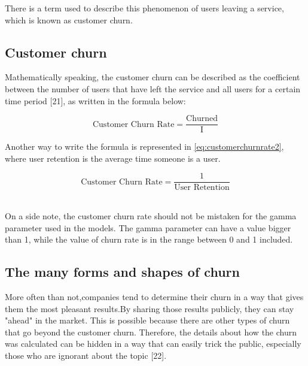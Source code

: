 \documentclass{article}
\begin{document}
There‌‌ is‌‌ a‌‌ term‌‌ used‌‌ to‌‌ describe‌‌ this‌‌ phenomenon‌‌ of‌‌ users‌‌ leaving‌‌ a‌‌ service, ‌‌which ‌‌is ‌‌known‌‌ as‌‌ customer‌ ‌churn.‌ \newpage

\subsection{Customer churn}

Mathematically‌ ‌speaking,‌ ‌the‌ ‌customer‌ ‌churn‌ ‌can‌ ‌be‌ ‌described‌ ‌as‌ ‌the‌ ‌coefficient‌ ‌between‌ ‌the‌‌
number‌ ‌of‌ ‌users‌ ‌that‌ ‌have‌ ‌left‌ ‌the‌ ‌service‌ ‌and‌ ‌all‌ ‌users‌ ‌for‌ ‌a‌ certain‌ ‌time‌ ‌period‌ ‌[21‌],‌ ‌as‌ ‌written‌‌
in‌ ‌the‌ ‌formula‌ ‌below:‌

\begin{equation}
    \text{Customer Churn Rate} = \frac{\text{Churned}}{\text{I}}
    \label{eq:customerchurnrate}
\end{equation}

Another‌ ‌way‌ ‌to‌ ‌write‌ ‌the‌ ‌formula‌ ‌is represented in \autoref{eq:customerchurnrate2}, where‌ ‌user‌ ‌retention‌ ‌is‌ ‌the‌ ‌average‌ ‌time‌ ‌someone‌ ‌is‌ ‌a‌ ‌user. 

\begin{equation}
    \text{Customer Churn Rate} = \frac{1}{\text{User Retention}}
    \label{eq:customerchurnrate2}
\end{equation}‌

On‌ ‌a‌ ‌side‌ ‌note,‌ ‌the‌ ‌customer‌ ‌churn‌ ‌rate‌ should not ‌be‌ ‌mistaken‌ ‌for‌ ‌the‌ ‌gamma‌ ‌parameter‌ ‌used‌‌ in‌ ‌the‌ ‌models.‌ ‌The‌ ‌gamma‌ ‌parameter‌ ‌can‌ ‌have‌ ‌a‌ ‌value‌ ‌bigger‌ ‌than‌ ‌1,‌ ‌while‌ ‌the‌ ‌value‌ ‌of‌ ‌churn‌‌ rate‌ ‌is‌ ‌in‌ ‌the‌ ‌range‌ ‌between‌ ‌0‌ ‌and‌ ‌1‌ ‌included.‌‌ ‌‌

\subsection{The many forms and shapes of churn}

More‌‌ often‌‌ than‌‌ not,‌‌companies‌‌ tend‌‌ to‌‌ determine‌‌ their‌‌ churn‌‌ in‌‌ a‌‌ way‌‌ that‌‌ gives‌‌ them‌‌ the‌‌ most‌‌ pleasant‌ ‌results.‌‌By‌‌ sharing‌‌ those‌‌ results‌‌ publicly,‌‌ they‌‌ can‌‌ stay‌‌ "ahead"‌‌ in‌‌ the‌‌ market.‌‌ This‌‌ is‌‌ possible‌‌ because‌‌ there‌‌ are‌‌ other‌‌ types‌‌ of‌‌ churn‌‌ that‌‌ go‌‌ beyond‌‌ the‌‌ customer‌‌ churn.‌‌ Therefore,‌‌ the‌‌ details‌‌ about‌‌ how‌‌ the‌‌ churn‌‌ was‌‌ calculated‌‌ can‌‌ be‌‌ hidden‌‌ in‌‌ a‌‌ way‌‌ that‌‌ can‌‌ easily‌‌ trick‌‌ the‌‌ public,‌ ‌especially‌ ‌those‌ ‌who‌ ‌are‌ ‌ignorant‌ ‌about‌ ‌the‌ ‌topic‌ [22].
\end{document}
